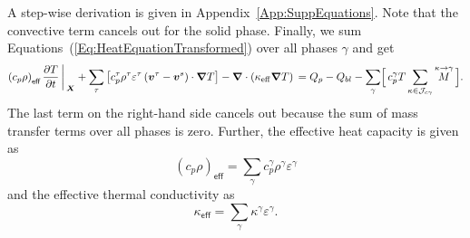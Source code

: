 \documentclass[Times1COL,AMA]{WileyNJDv5} %
\newcommand{\vct}[1]{\boldsymbol{#1}}
\begin{document}
A step-wise derivation is given in Appendix~\ref{App:SuppEquations}.
Note that the convective term cancels out for the solid phase.
Finally, we sum Equations~(\ref{Eq:HeatEquationTransformed}) over all phases $\gamma$ and get
\begin{equation}
    \left( c_p \rho \right)_{\textsf{eff}} \frac{\partial T}{\partial t}
    \bigg\arrowvert_{\vct{X}}
    +
    \sum \limits_{\tau} \left[ c_{p}^{\tau} \rho^{\tau}\varepsilon^{\tau} \left( \vct{v}^{\tau} - \vct{v}^s \right) \cdot \vct{\nabla} T \right]
    -
    \vct{\nabla} \cdot \left( \kappa_{\mathrm{eff}} \vct{\nabla}T\right) \\
    =
    Q_p
    -
    Q_{bl}
    -
    \sum\limits_{\gamma}  \Bigl[ \, c_{p}^{\gamma} T \sum\limits_{\kappa \in \mathcal{J}_{c\gamma}} \overset{\kappa \rightarrow \gamma}{M} \, \Bigr].
\end{equation}
The last term on the right-hand side cancels out because the sum of mass transfer terms over all phases is zero.
Further, the effective heat capacity is given as
\begin{equation}
    \left( c_p \rho \right)_{\textsf{eff}}
    =
    \sum\limits_{\gamma} c_{p}^{\gamma} \rho^\gamma \varepsilon^\gamma
\end{equation}
and the effective thermal conductivity as
\begin{equation}
    \kappa_{\textsf{eff}}
    =
    \sum\limits_{\gamma} \kappa^{\gamma} \varepsilon^\gamma.
\end{equation}
\end{document}

